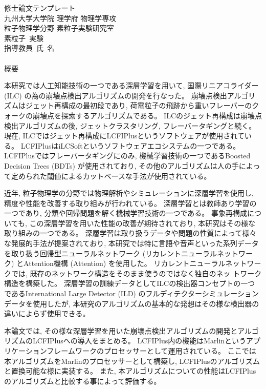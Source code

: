 
\begin{center}
\thispagestyle{empty}
{\Large 修士論文テンプレート}\\
九州大学大学院 理学府 物理学専攻 \\ 粒子物理学分野 素粒子実験研究室 \\
素粒子\ 実験 \\[1ex] 指導教員\ 氏\ 名\\ 　 \\
\fi
{\huge 概要}\\
\end{center}

本研究では人工知能技術の一つである深層学習を用いて, 国際リニアコライダー (ILC) の為の崩壊点検出アルゴリズムの開発を行なった。
崩壊点検出アルゴリズムはジェット再構成の最初段であり, 荷電粒子の飛跡から重いフレーバーのクォークの崩壊点を探索するアルゴリズムである。
ILCのジェット再構成は崩壊点検出アルゴリズムの後, ジェットクラスタリング, フレーバータギングと続く。
現在, ILCではジェット再構成にLCFIPlusというソフトウェアが使用されている。
LCFIPlusはiLCSoftというソフトウェアエコシステムの一つである。
LCFIPlusではフレーバータギングにのみ, 機械学習技術の一つであるBoosted Decision Trees (BDTs) が使用されており, その他のアルゴリズムは人の手によって定められた閾値によるカットベースな手法が使用されている。

近年, 粒子物理学の分野では物理解析やシミュレーションに深層学習を使用し, 精度や性能を改善する取り組みが行われている。
深層学習とは教師あり学習の一つであり, 分類や回帰問題を解く機械学習技術の一つである。
事象再構成についても, この深層学習を用いた性能の改善が期待されており, 本研究はその様な取り組みの一つである。
深層学習は取り扱うデータや問題の性質によって様々な発展的手法が提案されており, 本研究では特に言語や音声といった系列データを取り扱う回帰型ニューラルネットワーク (リカレントニューラルネットワーク) とAttention機構 (Attention) を使用した。
リカレントニューラルネットワークでは, 既存のネットワーク構造をそのまま使うのではなく独自のネッ トワーク構造を構築した。
深層学習の訓練データとしてILCの検出器コンセプトの一つであるInternational Large Detector (ILD) のフルディテクターシミュレーションデータを使用したが, 本研究のアルゴリズムの基本的な発想はその様な検出器の違いによらず使用できる。

本論文では, その様な深層学習を用いた崩壊点検出アルゴリズムの開発とアルゴリズムのLCFIPlusへの導入をまとめる。
LCFIPlus内の機能はMarlinというアプリケーションフレームワークのプロセッサーとして運用されている。
ここでは本アルゴリズムをMarlinのプロセッサーとして構築し, LCFIPlusのアルゴリズムと置換可能な様に実装する。
また, 本アルゴリズムについての性能はLCFIPlusのアルゴリズムと比較する事によって評価する。
